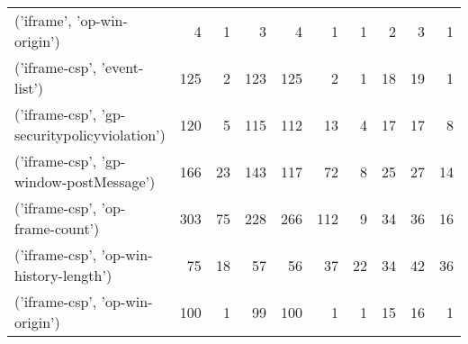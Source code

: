 \begin{tabular}{lrrrrrrrrr}
                 ('iframe', 'op-win-origin') &                                4 &                                  1 &                                      3 &                            4 &                           1 &                                   1 &                                      2 &                             3 &                            1 \\
                ('iframe-csp', 'event-list') &                              125 &                                  2 &                                    123 &                          125 &                           2 &                                   1 &                                     18 &                            19 &                            1 \\
('iframe-csp', 'gp-securitypolicyviolation') &                              120 &                                  5 &                                    115 &                          112 &                          13 &                                   4 &                                     17 &                            17 &                            8 \\
     ('iframe-csp', 'gp-window-postMessage') &                              166 &                                 23 &                                    143 &                          117 &                          72 &                                   8 &                                     25 &                            27 &                           14 \\
            ('iframe-csp', 'op-frame-count') &                              303 &                                 75 &                                    228 &                          266 &                         112 &                                   9 &                                     34 &                            36 &                           16 \\
     ('iframe-csp', 'op-win-history-length') &                               75 &                                 18 &                                     57 &                           56 &                          37 &                                  22 &                                     34 &                            42 &                           36 \\
             ('iframe-csp', 'op-win-origin') &                              100 &                                  1 &                                     99 &                          100 &                           1 &                                   1 &                                     15 &                            16 &                            1 \\

\end{tabular}
